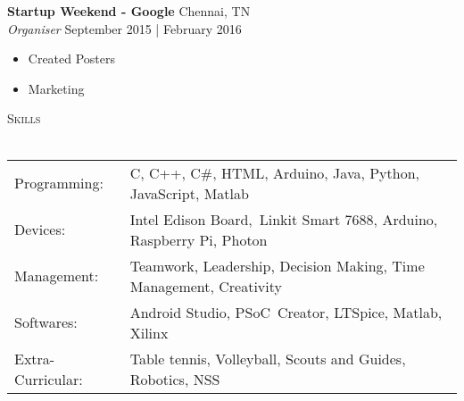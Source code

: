 \documentclass[a4paper]{article}
\newcommand{\lineunder} {
    \vspace*{-8pt} \\
    \hspace*{-18pt} \hrulefill \\
}
\newcommand{\header} [1] {
    {\hspace*{-18pt}\vspace*{6pt} \textsc{#1}}
    \vspace*{-6pt} \lineunder
}
\begin{document}
\textbf{Startup Weekend - Google} \hfill Chennai, TN\\
\textit{Organiser} \hfill September 2015 | February 2016\\
\vspace{-1mm}
\begin{itemize} \itemsep 1pt
	\item Created Posters
	\item Marketing
\end{itemize}

\header{Skills}
\begin{tabular}{ l l }
	Programming:      & C, C++, C\#, HTML, Arduino, Java, Python, JavaScript, Matlab          \\
	Devices:          & Intel Edison Board, Linkit Smart 7688, Arduino, Raspberry Pi, Photon \\
	Management:       & Teamwork, Leadership, Decision Making, Time Management, Creativity    \\
	Softwares:        & Android Studio, PSoC Creator, LTSpice, Matlab, Xilinx                \\
	Extra-Curricular: & Table tennis, Volleyball, Scouts and Guides, Robotics, NSS            \\
\end{tabular}

\vspace*{2mm}
\end{document}
